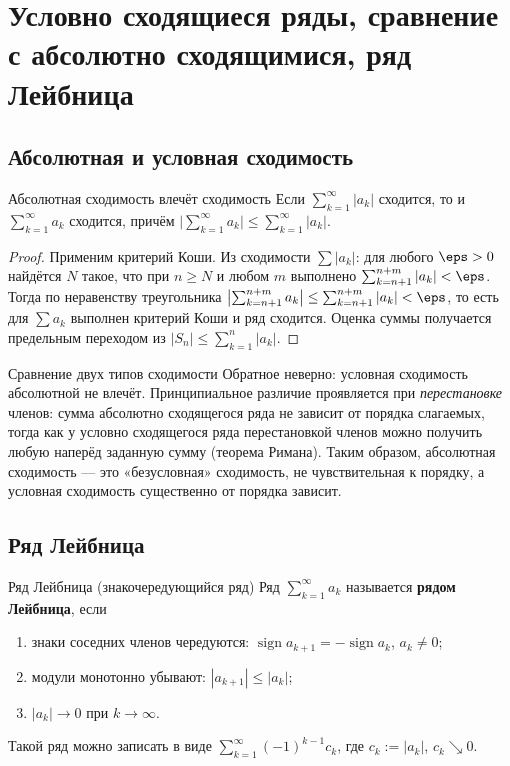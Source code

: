 
\section{Условно сходящиеся ряды, сравнение с абсолютно сходящимися, ряд Лейбница}

\subsection*{Абсолютная и условная сходимость}

\begin{Statement}{Абсолютная сходимость влечёт сходимость}{}
	Если $\sum_{k=1}^{\infty} |a_k|$ сходится, то и $\sum_{k=1}^{\infty} a_k$
	сходится, причём
	$\bigl|\sum_{k=1}^{\infty} a_k\bigr|\le\sum_{k=1}^{\infty} |a_k|$.
\end{Statement}

\begin{proof}
	Применим критерий Коши. Из сходимости $\sum|a_k|$: для любого $\eps>0$
	найдётся $N$ такое, что при $n\ge N$ и любом $m$ выполнено
	$\sum_{k=n+1}^{n+m}|a_k|<\eps$. Тогда по неравенству треугольника
	$\bigl|\sum_{k=n+1}^{n+m} a_k\bigr|\le\sum_{k=n+1}^{n+m}|a_k|<\eps$, то есть
	для $\sum a_k$ выполнен критерий Коши и ряд сходится. Оценка суммы получается
	предельным переходом из $|S_n|\le\sum_{k=1}^n|a_k|$.
\end{proof}

\begin{Remark}{Сравнение двух типов сходимости}{}
	Обратное неверно: условная сходимость абсолютной не влечёт. Принципиальное
	различие проявляется при \emph{перестановке} членов: сумма абсолютно
	сходящегося ряда не зависит от порядка слагаемых, тогда как у условно
	сходящегося ряда перестановкой членов можно получить любую наперёд заданную
	сумму (теорема Римана). Таким образом, абсолютная сходимость --- это
	«безусловная» сходимость, не чувствительная к порядку, а условная
	сходимость существенно от порядка зависит.
\end{Remark}

\subsection*{Ряд Лейбница}

\begin{Definition}{Ряд Лейбница (знакочередующийся ряд)}{}
	Ряд $\sum_{k=1}^{\infty} a_k$ называется \textbf{рядом Лейбница}, если
	\begin{enumerate}
		\item знаки соседних членов чередуются:
		$\operatorname{sign} a_{k+1}=-\operatorname{sign} a_k$, $a_k\ne0$;
		\item модули монотонно убывают: $|a_{k+1}|\le|a_k|$;
		\item $|a_k|\to0$ при $k\to\infty$.
	\end{enumerate}
	Такой ряд можно записать в виде $\sum_{k=1}^{\infty} (-1)^{k-1} c_k$, где
	$c_k:=|a_k|$, $c_k\searrow0$.
\end{Definition}

